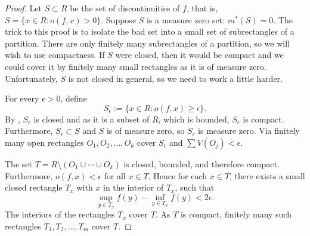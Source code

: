 \begin{proof}
Let $S \subset R$ be the set of discontinuities of $f$, that is,
$S = \{ x \in R : o(f,x) > 0 \}$.
Suppose $S$ is a measure zero set: $m^*(S) = 0$.
The trick to this proof is to isolate the
bad set into a small set of subrectangles of a partition.  There are only
finitely many subrectangles of a partition, so we will wish to use
compactness.  If $S$ were closed, then it would be compact and we could cover
it by finitely many small rectangles as it is of measure zero.  Unfortunately, $S$
is not closed in general, so we need to work a little harder.

For every $\epsilon > 0$, define
\begin{equation*}
S_\epsilon := \{ x \in R : o(f,x) \geq \epsilon \} .
\end{equation*}
By , $S_\epsilon$ is closed and as it is a subset of
$R$,
which is bounded, $S_\epsilon$ is compact.  Furthermore,
$S_\epsilon \subset S$ and $S$ is of measure zero, so $S_\epsilon$ is
measure zero.
Via  finitely many open rectangles
$O_1,O_2,\ldots,O_k$ cover $S_\epsilon$ and
$\sum V(O_j) < \epsilon$.  

The set $T = R \setminus ( O_1 \cup \cdots \cup O_k )$ is closed, bounded,
and therefore compact.  Furthermore, $o(f,x) < \epsilon$ for all $x \in T$.
Hence for each $x \in T$, there exists a small closed rectangle
$T_x$ with $x$ in the interior of $T_x$, such that
\begin{equation*}
\sup_{y\in T_x} f(y) - \inf_{y\in T_x} f(y) < 2\epsilon.
\end{equation*}
The interiors of the rectangles $T_x$ cover $T$.  As $T$ is compact,
finitely many such rectangles $T_1, T_2, \ldots, T_m$
cover $T$.


\end{proof}
